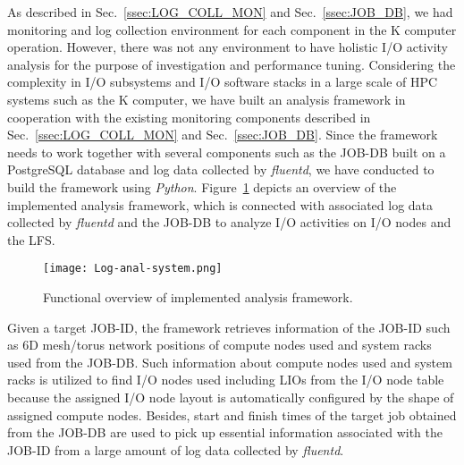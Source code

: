 \documentclass{jhps}
\begin{document}
As described in Sec.~\ref{ssec:LOG_COLL_MON} and Sec.~\ref{ssec:JOB_DB},
we had monitoring and log collection environment for each component
in the K computer operation.
However, there was not any environment to have holistic I/O activity analysis
for the purpose of investigation and performance tuning.
Considering the complexity in I/O subsystems and I/O software stacks
in a large scale of HPC systems such as the K computer,
we have built an analysis framework in cooperation with
the existing monitoring components described in
Sec.~\ref{ssec:LOG_COLL_MON} and Sec.~\ref{ssec:JOB_DB}.
Since the framework needs to work together with several components
such as the JOB-DB built on a PostgreSQL database and log data
collected by {\itshape fluentd},
we have conducted to build the framework using {\itshape Python}.
Figure~\ref{fig:LOG_ANAL_SYS} depicts an overview of the implemented analysis framework,
which is connected with associated log data collected by {\itshape fluentd}
and the JOB-DB to analyze I/O activities on I/O nodes and the LFS.
%
\begin{figure}[tb]
\centering
\texttt{[image: Log-anal-system.png]}
\caption{Functional overview of implemented analysis framework.}
\label{fig:LOG_ANAL_SYS}
\end{figure}
%
Given a target JOB-ID, the framework retrieves information of the JOB-ID
such as 6D mesh/torus network positions of compute nodes used and
system racks used from the JOB-DB.
Such information about compute nodes used and system racks is utilized
to find I/O nodes used including LIOs from the I/O node table
because the assigned I/O node layout is automatically configured
by the shape of assigned compute nodes.
Besides, start and finish times of the target job obtained from the JOB-DB
are used to pick up essential information associated with the JOB-ID
from a large amount of log data collected by {\itshape fluentd}.
\end{document}
